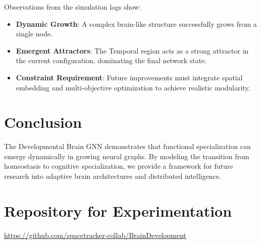 \documentclass[12pt]{article}
\begin{document}
Observations from the simulation logs show:
\begin{itemize}
\item \textbf{Dynamic Growth}: A complex brain-like structure successfully grows from a single node.
\item \textbf{Emergent Attractors}: The Temporal region acts as a strong attractor in the current configuration, dominating the final network state.
\item \textbf{Constraint Requirement}: Future improvements must integrate spatial embedding and multi-objective optimization to achieve realistic modularity.
\end{itemize}

\section{Conclusion}
The Developmental Brain GNN demonstrates that functional specialization can emerge dynamically in growing neural graphs. By modeling the transition from homeostasis to cognitive specialization, we provide a framework for future research into adaptive brain architectures and distributed intelligence.

\section{Repository for Experimentation}
\noindent
\url{https://github.com/spacetracker-collab/BrainDevelopment}
\end{document}

